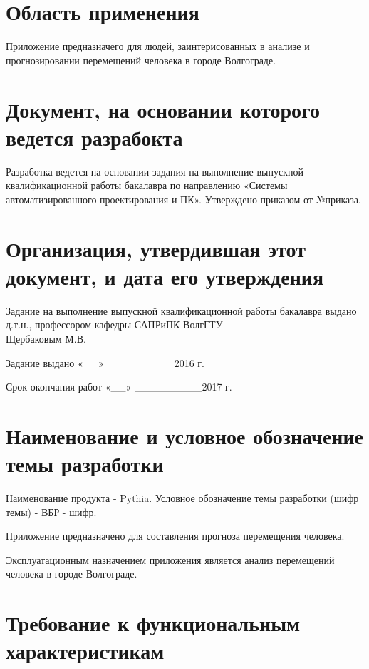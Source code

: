 \documentclass[a4paper,english]{G2-105}
\begin{document}
	\section{Область применения}
		\par Приложение предназначего для людей, заинтерисованных в анализе и прогнозировании перемещений человека в городе Волгограде.
		
	\ttl
	\section{Документ, на основании которого ведется разрабокта}
		\par Разработка ведется на основании задания на выполнение выпускной квалификационной работы бакалавра по направлению  «Системы автоматизированного проектирования и ПК». Утверждено приказом от №приказа.
	\section{Организация, утвердившая этот документ, и дата его утверждения}
		\par Задание на выполнение выпускной квалификационной работы бакалавра выдано д.т.н., профессором кафедры САПРиПК ВолгГТУ \\Щербаковым М.В.
		\par Задание выдано «\_\_» \_\_\_\_\_\_\_\_\_2016 г.
		\par Срок окончания работ «\_\_» \_\_\_\_\_\_\_\_\_2017 г.
	\section{Наименование и условное обозначение темы разработки}
		\par Наименование продукта - Pythia. Условное обозначение темы разработки (шифр темы) - ВБР - шифр.

	\ttl
	\par Приложение предназначено для составления прогноза перемещения человека. 
	\par Эксплуатационным назначением приложения является анализ перемещений человека в городе Волгограде. 

	\ttl
	\section{Требование к функциональным характеристикам}
\end{document}

